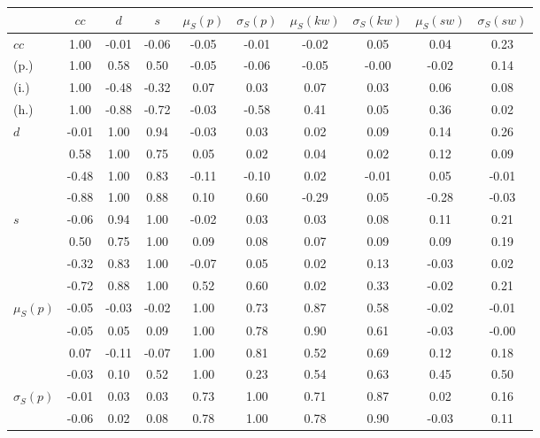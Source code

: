 \begin{table*}[h!]
\begin{center}
\begin{tabular}{| l | c | c | c | c | c | c | c | c | c |}\hline
 & $cc$ & $d$ & $s$ & $\mu_S(p)$ & $\sigma_S(p)$ & $\mu_S(kw)$ & $\sigma_S(kw)$ & $\mu_S(sw)$ & $\sigma_S(sw)$ \\\hline
$cc$ & 1.00  & -0.01  & -0.06  & -0.05  & -0.01  & -0.02  & 0.05  & 0.04  & 0.23 \\\hline
(p.) & 1.00  & 0.58  & 0.50  & -0.05  & -0.06  & -0.05  & -0.00  & -0.02  & 0.14 \\\hline
(i.) & 1.00  & -0.48  & -0.32  & 0.07  & 0.03  & 0.07  & 0.03  & 0.06  & 0.08 \\\hline
(h.) & 1.00  & -0.88  & -0.72  & -0.03  & -0.58  & 0.41  & 0.05  & 0.36  & 0.02 \\\hline
$d$ & -0.01  & 1.00  & 0.94  & -0.03  & 0.03  & 0.02  & 0.09  & 0.14  & 0.26 \\\hline
 & 0.58  & 1.00  & 0.75  & 0.05  & 0.02  & 0.04  & 0.02  & 0.12  & 0.09 \\\hline
 & -0.48  & 1.00  & 0.83  & -0.11  & -0.10  & 0.02  & -0.01  & 0.05  & -0.01 \\\hline
 & -0.88  & 1.00  & 0.88  & 0.10  & 0.60  & -0.29  & 0.05  & -0.28  & -0.03 \\\hline
$s$ & -0.06  & 0.94  & 1.00  & -0.02  & 0.03  & 0.03  & 0.08  & 0.11  & 0.21 \\\hline
 & 0.50  & 0.75  & 1.00  & 0.09  & 0.08  & 0.07  & 0.09  & 0.09  & 0.19 \\\hline
 & -0.32  & 0.83  & 1.00  & -0.07  & 0.05  & 0.02  & 0.13  & -0.03  & 0.02 \\\hline
 & -0.72  & 0.88  & 1.00  & 0.52  & 0.60  & 0.02  & 0.33  & -0.02  & 0.21 \\\hline
$\mu_S(p)$ & -0.05  & -0.03  & -0.02  & 1.00  & 0.73  & 0.87  & 0.58  & -0.02  & -0.01 \\\hline
 & -0.05  & 0.05  & 0.09  & 1.00  & 0.78  & 0.90  & 0.61  & -0.03  & -0.00 \\\hline
 & 0.07  & -0.11  & -0.07  & 1.00  & 0.81  & 0.52  & 0.69  & 0.12  & 0.18 \\\hline
 & -0.03  & 0.10  & 0.52  & 1.00  & 0.23  & 0.54  & 0.63  & 0.45  & 0.50 \\\hline
$\sigma_S(p)$ & -0.01  & 0.03  & 0.03  & 0.73  & 1.00  & 0.71  & 0.87  & 0.02  & 0.16 \\\hline
 & -0.06  & 0.02  & 0.08  & 0.78  & 1.00  & 0.78  & 0.90  & -0.03  & 0.11 \\\hline

\end{tabular}
\end{center}
\end{table*}
